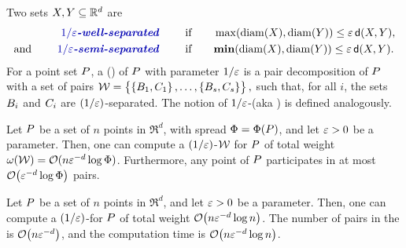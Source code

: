 \documentclass[12pt]{article}%
\begin{document}
\begin{defn}
    Two sets $X, Y \subseteq \mathbb{R}^d$ are 
    \begin{align*}
      \text{\emphi{$1/\eps$-well-separated}}
      \qquad
      &\text{if}\qquad
        \max \pth{ \diameterX{\PSX}, \diameterX{\PSY} } \leq
        \eps \, \dsY{\PSX}{\PSY},
      \\
      \text{and} \qquad \text{\emphi{$1/\eps$-semi-separated}}
      \qquad
      &\text{if}\qquad
        \mathbf{min} \pth{ \diameterX{\PSX}, \diameterX{\PSY} }
        \leq
        \eps \, \dsY{\PSX}{\PSY}.
    \end{align*}
    For a point set $P$, a  (\emphOnly{\WSPD{}}) of $P$ with parameter
    $1/\varepsilon$ is a pair decomposition of $P$ with a set of pairs
    \begin{math}
        \mathcal{W} = \left\{ {\bigl.
           \left\{ {B_1,C_1} \right\},\ldots,\left\{ {B_s,C_s} \right\}} \right\},
    \end{math}
    such that, for all $i$, the sets $B_i$ and $C_i$ are
    $(1/\varepsilon)$-separated. The notion of $1/\varepsilon$-\SSPD (aka
    ) is defined
    analogously.
\end{defn}


\begin{lemma}
    Let $P$ be a set of $n$ points in $\Re^d$, with spread
    $\spread = \spreadX{\PS}$, and let $\varepsilon > 0$ be a
    parameter. Then, one can compute a $(1/\varepsilon)$-\WSPD $\mathcal{W}$ for
    $P$ of total weight
    $\WeightX{\WS} = \Of(n \eps^{-d} \log \spread)$. Furthermore, any
    point of $P$ participates in at most
    $\Of\pth{ \eps^{-d} \log \spread}$ pairs.
\end{lemma}


\begin{theorem}
    Let $P$ be a set of $n$ points in $\Re^d$, and let $\varepsilon > 0$ be
    a parameter. Then, one can compute a $(1/\varepsilon)$-\SSPD for $P$ of
    total weight $\Of\pth{n \eps^{-d} \log n}$. The number of pairs in
    the \SSPD is $\Of\pth{n \eps^{-d}}$, and the computation time is
    $\Of\pth{ n \eps^{-d} \log n }$.
\end{theorem}
\end{document}

